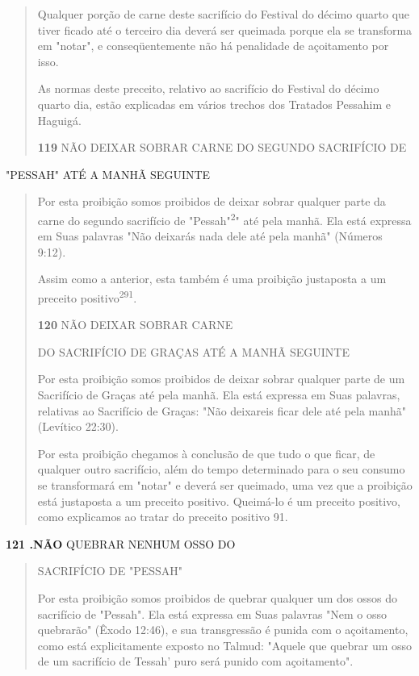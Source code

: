 \begin{quote}
Qualquer porção de carne deste sacrifício do Festival do décimo quar­to
que tiver ficado até o terceiro dia deverá ser queimada porque ela se
trans­forma em "notar", e conseqüentemente não há penalidade de
açoitamento por isso.

As normas deste preceito, relativo ao sacrifício do Festival do déci­mo
quarto dia, estão explicadas em vários trechos dos Tratados Pessahim e
Haguigá.

\textbf{119} NÃO DEIXAR SOBRAR CARNE DO SEGUNDO SACRIFÍCIO DE
\end{quote}

"PESSAH" ATÉ A MANHÃ SEGUINTE

\begin{quote}
Por esta proibição somos proibidos de deixar sobrar qualquer parte da
carne do segundo sacrifício de "Pessah"\textsuperscript{2}" até pela
manhã. Ela está expressa em Suas palavras "Não deixarás nada dele até
pela manhã" (Números 9:12).

Assim como a anterior, esta também é uma proibição justaposta a um
preceito positivo\textsuperscript{291}.

\textbf{120} NÃO DEIXAR SOBRAR CARNE

DO SACRIFÍCIO DE GRAÇAS ATÉ A MANHÃ SEGUINTE

Por esta proibição somos proibidos de deixar sobrar qualquer parte de um
Sacrifício de Graças até pela manhã. Ela está expressa em Suas palavras,
relativas ao Sacrifício de Graças: "Não deixareis ficar dele até pela
manhã" (Le­vítico 22:30).

Por esta proibição chegamos à conclusão de que tudo o que ficar, de
qualquer outro sacrifício, além do tempo determinado para o seu consumo
se transformará em "notar" e deverá ser queimado, uma vez que a
proibição está justaposta a um preceito positivo. Queimá-lo é um
preceito positivo, co­mo explicamos ao tratar do preceito positivo 91.
\end{quote}

\textbf{121 .NÃO} QUEBRAR NENHUM OSSO DO

\begin{quote}
SACRIFÍCIO DE "PESSAH"

Por esta proibição somos proibidos de quebrar qualquer um dos os­sos do
sacrifício de "Pessah". Ela está expressa em Suas palavras "Nem o osso
quebrarão" (Êxodo 12:46), e sua transgressão é punida com o açoitamento,
co­mo está explicitamente exposto no Talmud: "Aquele que quebrar um osso
de um sacrifício de Tessah' puro será punido com açoitamento".
\end{quote}

